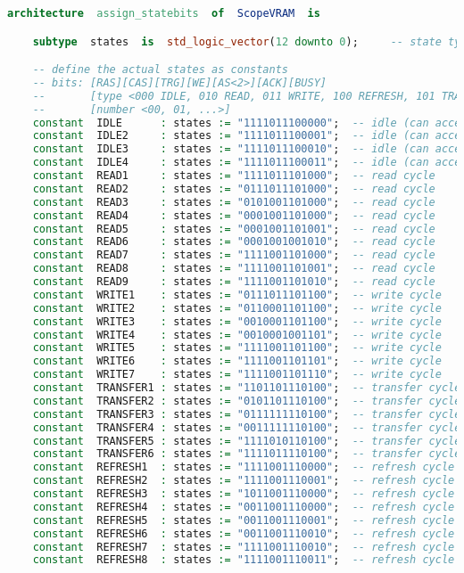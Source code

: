 \begin{lstlisting}[language=vhdl]
architecture  assign_statebits  of  ScopeVRAM  is

    subtype  states  is  std_logic_vector(12 downto 0);     -- state type

    -- define the actual states as constants
    -- bits: [RAS][CAS][TRG][WE][AS<2>][ACK][BUSY]
    --       [type <000 IDLE, 010 READ, 011 WRITE, 100 REFRESH, 101 TRANSFER>]
    --       [number <00, 01, ...>]
    constant  IDLE      : states := "1111011100000";  -- idle (can accept R/W)
    constant  IDLE2     : states := "1111011100001";  -- idle (can accept R/W)
    constant  IDLE3     : states := "1111011100010";  -- idle (can accept R/W)
    constant  IDLE4     : states := "1111011100011";  -- idle (can accept R/W, srt, refresh)
    constant  READ1     : states := "1111011101000";  -- read cycle
    constant  READ2     : states := "0111011101000";  -- read cycle
    constant  READ3     : states := "0101001101000";  -- read cycle
    constant  READ4     : states := "0001001101000";  -- read cycle
    constant  READ5     : states := "0001001101001";  -- read cycle
    constant  READ6     : states := "0001001001010";  -- read cycle
    constant  READ7     : states := "1111001101000";  -- read cycle
    constant  READ8     : states := "1111001101001";  -- read cycle
    constant  READ9     : states := "1111001101010";  -- read cycle
    constant  WRITE1    : states := "0111011101100";  -- write cycle
    constant  WRITE2    : states := "0110001101100";  -- write cycle
    constant  WRITE3    : states := "0010001101100";  -- write cycle
    constant  WRITE4    : states := "0010001001101";  -- write cycle
    constant  WRITE5    : states := "1111001101100";  -- write cycle
    constant  WRITE6    : states := "1111001101101";  -- write cycle
    constant  WRITE7    : states := "1111001101110";  -- write cycle
    constant  TRANSFER1 : states := "1101101110100";  -- transfer cycle
    constant  TRANSFER2 : states := "0101101110100";  -- transfer cycle
    constant  TRANSFER3 : states := "0111111110100";  -- transfer cycle
    constant  TRANSFER4 : states := "0011111110100";  -- transfer cycle
    constant  TRANSFER5 : states := "1111010110100";  -- transfer cycle
    constant  TRANSFER6 : states := "1111011110100";  -- transfer cycle
    constant  REFRESH1  : states := "1111001110000";  -- refresh cycle
    constant  REFRESH2  : states := "1111001110001";  -- refresh cycle
    constant  REFRESH3  : states := "1011001110000";  -- refresh cycle
    constant  REFRESH4  : states := "0011001110000";  -- refresh cycle
    constant  REFRESH5  : states := "0011001110001";  -- refresh cycle
    constant  REFRESH6  : states := "0011001110010";  -- refresh cycle
    constant  REFRESH7  : states := "1111001110010";  -- refresh cycle
    constant  REFRESH8  : states := "1111001110011";  -- refresh cycle



\end{lstlisting}
